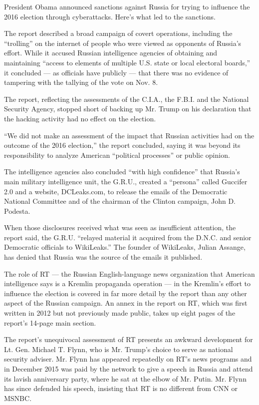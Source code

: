 President Obama announced sanctions against Russia for trying to
influence the 2016 election through cyberattacks. Here's what led to the
sanctions.

The report described a broad campaign of covert operations, including
the ``trolling'' on the internet of people who were viewed as opponents
of Russia's effort. While it accused Russian intelligence agencies of
obtaining and maintaining ``access to elements of multiple U.S. state or
local electoral boards,'' it concluded --- as officials have publicly
--- that there was no evidence of tampering with the tallying of the
vote on Nov. 8.

The report, reflecting the assessments of the C.I.A., the F.B.I. and the
National Security Agency, stopped short of backing up Mr. Trump on his
declaration that the hacking activity had no effect on the election.

``We did not make an assessment of the impact that Russian activities
had on the outcome of the 2016 election,'' the report concluded, saying
it was beyond its responsibility to analyze American ``political
processes'' or public opinion.

The intelligence agencies also concluded ``with high confidence'' that
Russia's main military intelligence unit, the G.R.U., created a
``persona'' called Guccifer 2.0 and a website, DCLeaks.com, to release
the emails of the Democratic National Committee and of the chairman of
the Clinton campaign, John D. Podesta.

When those disclosures received what was seen as insufficient attention,
the report said, the G.R.U. ``relayed material it acquired from the
D.N.C. and senior Democratic officials to WikiLeaks.'' The founder of
WikiLeaks, Julian Assange, has denied that Russia was the source of the
emails it published.

The role of RT --- the Russian English-language news organization that
American intelligence says is a Kremlin propaganda operation --- in the
Kremlin's effort to influence the election is covered in far more detail
by the report than any other aspect of the Russian campaign. An annex in
the report on RT, which was first written in 2012 but not previously
made public, takes up eight pages of the report's 14-page main section.

The report's unequivocal assessment of RT presents an awkward
development for Lt. Gen. Michael T. Flynn, who is Mr. Trump's choice to
serve as national security adviser. Mr. Flynn has appeared repeatedly on
RT's news programs and in December 2015 was paid by the network to give
a speech in Russia and attend its lavish anniversary party, where he sat
at the elbow of Mr. Putin. Mr. Flynn has since defended his speech,
insisting that RT is no different from CNN or MSNBC.

